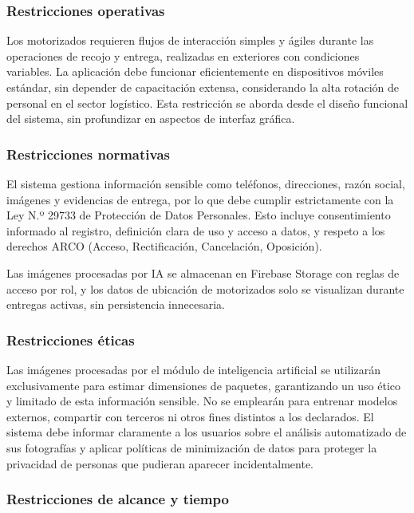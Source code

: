 \subsubsection{Restricciones operativas}

Los motorizados requieren flujos de interacción simples y ágiles durante las operaciones de recojo y entrega, realizadas en exteriores con condiciones variables. La aplicación debe funcionar eficientemente en dispositivos móviles estándar, sin depender de capacitación extensa, considerando la alta rotación de personal en el sector logístico. Esta restricción se aborda desde el diseño funcional del sistema, sin profundizar en aspectos de interfaz gráfica.

\subsubsection{Restricciones normativas}

El sistema gestiona información sensible como teléfonos, direcciones, razón social, imágenes y evidencias de entrega, por lo que debe cumplir estrictamente con la Ley N.º 29733 de Protección de Datos Personales. Esto incluye consentimiento informado al registro, definición clara de uso y acceso a datos, y respeto a los derechos ARCO (Acceso, Rectificación, Cancelación, Oposición).

Las imágenes procesadas por IA se almacenan en Firebase Storage con reglas de acceso por rol, y los datos de ubicación de motorizados solo se visualizan durante entregas activas, sin persistencia innecesaria.

\subsubsection{Restricciones éticas}

Las imágenes procesadas por el módulo de inteligencia artificial se utilizarán exclusivamente para estimar dimensiones de paquetes, garantizando un uso ético y limitado de esta información sensible. No se emplearán para entrenar modelos externos, compartir con terceros ni otros fines distintos a los declarados. El sistema debe informar claramente a los usuarios sobre el análisis automatizado de sus fotografías y aplicar políticas de minimización de datos para proteger la privacidad de personas que pudieran aparecer incidentalmente.

\subsubsection{Restricciones de alcance y tiempo}

